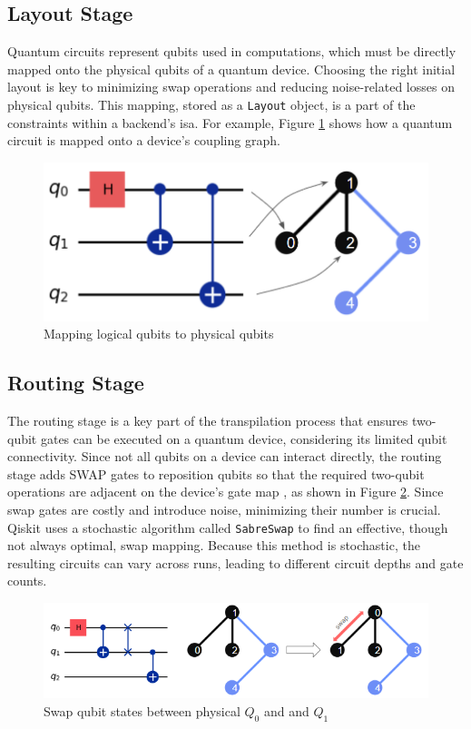 \subsection{Layout Stage} %
Quantum circuits represent qubits used in computations, which must be directly mapped onto the physical qubits of a quantum device. Choosing the right initial layout is key to minimizing swap operations and reducing noise-related losses on physical qubits. This mapping, stored as a \lstinline{Layout} object, is a part of the constraints within a backend's \acrfull{isa}. For example, Figure \ref{fig:layout-placement} shows how a quantum circuit is mapped onto a device's coupling graph.
\begin{figure}[h]
    \centering
    \includegraphics[width=0.5\linewidth]{image/layout_placement.png}
    \caption{Mapping logical qubits to physical qubits}
    \label{fig:layout-placement}
\end{figure}

\subsection{Routing Stage} %
The routing stage is a key part of the transpilation process that ensures two-qubit gates can be executed on a quantum device, considering its limited qubit connectivity. Since not all qubits on a device can interact directly, the routing stage adds SWAP gates to reposition qubits so that the required two-qubit operations are adjacent on the device's gate map \cite{wille_mqt_2023}, as shown in Figure \ref{fig:swap-placement}. Since swap gates are costly and introduce noise, minimizing their number is crucial. Qiskit uses a stochastic algorithm called \lstinline{SabreSwap} \cite{li_tackling_2019} to find an effective, though not always optimal, swap mapping. Because this method is stochastic, the resulting circuits can vary across runs, leading to different circuit depths and gate counts. \\
\begin{figure}[htb]
    \centering
    \includegraphics[width=0.7\linewidth]{image/swap_placement.png}
    \caption{Swap qubit states between physical $Q_0$ and and $Q_1$}
    \label{fig:swap-placement}
\end{figure}



